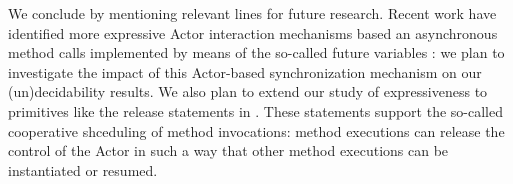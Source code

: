 \documentclass{LMCS}
\theoremstyle{plain}\newtheorem{proposition}[thm]{Proposition}
\theoremstyle{plain}\newtheorem{lemma}[thm]{Lemma}
\theoremstyle{plain}\newtheorem{theorem}[thm]{Theorem}
\theoremstyle{plain}\newtheorem{corollary}[thm]{Corollary}
\begin{document}
\noindent We conclude by mentioning 
relevant lines
for future research. Recent work have identified more expressive Actor interaction
mechanisms based an asynchronous method calls implemented by means of the so-called
future variables \cite{BoerCJ07}: we plan to investigate the impact of this
Actor-based synchronization mechanism on our (un)decidability results.
We also plan to extend our study of expressiveness to 
primitives like the release statements in \cite{Johnsen07}. 
These statements support the so-called cooperative shceduling
of method invocations:
method executions can release the 
control of the Actor in such a way that other method executions
can be instantiated or resumed.









\end{document}
